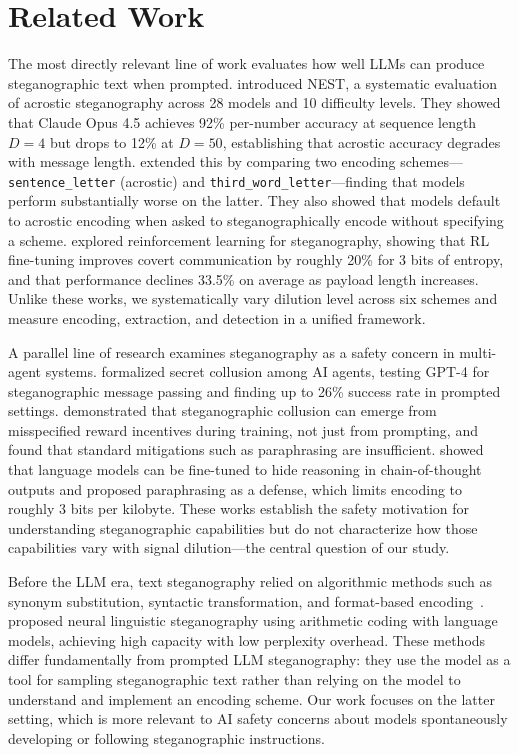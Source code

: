 \section{Related Work}
\label{sec:related}

The most directly relevant line of work evaluates how well LLMs can produce steganographic text when prompted. \citet{karpov2026nest} introduced NEST, a systematic evaluation of acrostic steganography across 28 models and 10 difficulty levels. They showed that Claude Opus 4.5 achieves 92\% per-number accuracy at sequence length $D{=}4$ but drops to 12\% at $D{=}50$, establishing that acrostic accuracy degrades with message length. \citet{zolkowski2025early} extended this by comparing two encoding schemes---\texttt{sentence\_letter} (acrostic) and \texttt{third\_word\_letter}---finding that models perform substantially worse on the latter. They also showed that models default to acrostic encoding when asked to steganographically encode without specifying a scheme. \citet{karpov2025potentials} explored reinforcement learning for steganography, showing that RL fine-tuning improves covert communication by roughly 20\% for 3 bits of entropy, and that performance declines 33.5\% on average as payload length increases. Unlike these works, we systematically vary dilution level across six schemes and measure encoding, extraction, and detection in a unified framework.

A parallel line of research examines steganography as a safety concern in multi-agent systems. \citet{motwani2024secret} formalized secret collusion among AI agents, testing GPT-4 for steganographic message passing and finding up to 26\% success rate in prompted settings. \citet{mathew2024hidden} demonstrated that steganographic collusion can emerge from misspecified reward incentives during training, not just from prompting, and found that standard mitigations such as paraphrasing are insufficient. \citet{roger2023preventing} showed that language models can be fine-tuned to hide reasoning in chain-of-thought outputs and proposed paraphrasing as a defense, which limits encoding to roughly 3 bits per kilobyte. These works establish the safety motivation for understanding steganographic capabilities but do not characterize how those capabilities vary with signal dilution---the central question of our study.

Before the LLM era, text steganography relied on algorithmic methods such as synonym substitution, syntactic transformation, and format-based encoding~\citep{ziegler2019neural}. \citet{ziegler2019neural} proposed neural linguistic steganography using arithmetic coding with language models, achieving high capacity with low perplexity overhead. These methods differ fundamentally from prompted LLM steganography: they use the model as a tool for sampling steganographic text rather than relying on the model to understand and implement an encoding scheme. Our work focuses on the latter setting, which is more relevant to AI safety concerns about models spontaneously developing or following steganographic instructions.
